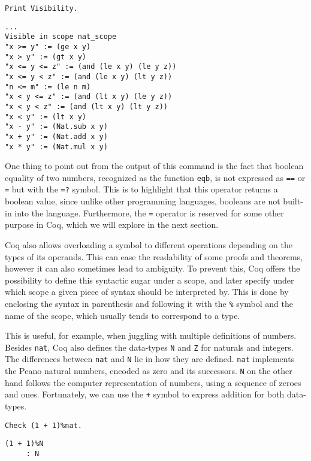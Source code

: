 \begin{verbatim}
Print Visibility.
\end{verbatim}
\vspace{-\baselineskip*5/4}
\begin{verbatim}
...
Visible in scope nat_scope
"x >= y" := (ge x y)
"x > y" := (gt x y)
"x <= y <= z" := (and (le x y) (le y z))
"x <= y < z" := (and (le x y) (lt y z))
"n <= m" := (le n m)
"x < y <= z" := (and (lt x y) (le y z))
"x < y < z" := (and (lt x y) (lt y z))
"x < y" := (lt x y)
"x - y" := (Nat.sub x y)
"x + y" := (Nat.add x y)
"x * y" := (Nat.mul x y)
\end{verbatim}

One thing to point out from the output of this command is the fact that boolean equality of two numbers,
recognized as the function \texttt{eqb}, is not expressed as \texttt{==} or 
\texttt{=} but with the \texttt{=?} symbol. This is to highlight that this operator returns a boolean
value, since unlike other programming languages, booleans are not built-in into the language. Furthermore,
the \texttt{=} operator is reserved for some other purpose in Coq, which we will explore
in the next section.

Coq also allows overloading a symbol to different operations depending on the types of its
operands. This can ease the readability of some proofs and theorems, however it can also
sometimes lead to ambiguity. To prevent this, Coq offers the possibility to define this
syntactic sugar under a scope, and later specify under which scope a given piece of syntax
should be interpreted by. This is done by enclosing the syntax in parenthesis and following
it with the \texttt{\%} symbol and the name of the scope, which usually tends to
correspond to a type.

This is useful, for example, when juggling with multiple
definitions of numbers. Besides \texttt{nat}, Coq also defines the data-types
\texttt{N} and \texttt{Z} for naturals and integers. The differences
between \texttt{nat} and \texttt{N} lie in how they are defined. 
\texttt{nat} implements the Peano natural numbers, encoded as zero and its
successors. \texttt{N} on the other hand follows the computer representation
of numbers, using a sequence of zeroes and ones. Fortunately, we can use the \texttt{+}
symbol to express addition for both data-types.

\begin{verbatim}
Check (1 + 1)%nat. 
\end{verbatim}
\vspace{-\baselineskip*3/2}
\begin{verbatim}
(1 + 1)%N
     : N
\end{verbatim}

